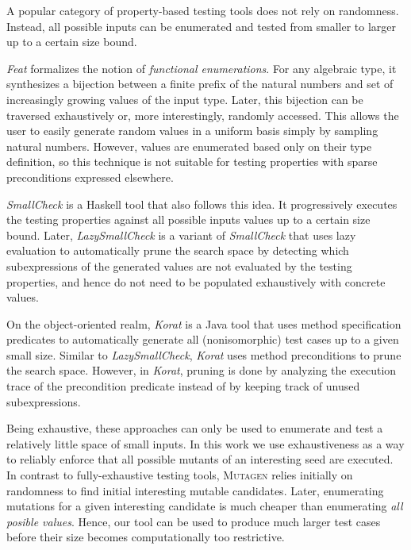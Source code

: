 \documentclass[acmsmall, anonymous]{acmart}
\newcommand{\mutagen}{\textsc{Mutagen}\xspace}
\begin{document}
A popular category of property-based testing tools does not rely on randomness.
%
Instead, all possible inputs can be enumerated and tested from smaller to larger
up to a certain size bound.

%
%
\emph{Feat} \cite{feat} formalizes the notion of \emph{functional enumerations}.
%
For any algebraic type, it synthesizes a bijection between a finite prefix of
the natural numbers and set of increasingly growing values of the input type.
%
Later, this bijection can be traversed exhaustively or, more interestingly,
randomly accessed.
%
This allows the user to easily generate random values in a uniform basis simply
by sampling natural numbers.
%
However, values are enumerated based only on their type definition, so this
technique is not suitable for testing properties with sparse preconditions
expressed elsewhere.


\emph{SmallCheck} \cite{smallcheck} is a Haskell tool that also follows this
idea.
%
It progressively executes the testing properties against all possible inputs
values up to a certain size bound.
%
Later, \emph{LazySmallCheck} is a variant of \emph{SmallCheck} that uses lazy
evaluation to automatically prune the search space by detecting which
subexpressions of the generated values are not evaluated by the testing
properties, and hence do not need to be populated exhaustively with concrete
values.



On the object-oriented realm, \emph{Korat} \cite{korat} is a Java tool that uses
method specification predicates to automatically generate all (nonisomorphic)
test cases up to a given small size.
%
Similar to \emph{LazySmallCheck}, \emph{Korat} uses method preconditions to
prune the search space.
%
However, in \emph{Korat}, pruning is done by analyzing the execution trace of
the precondition predicate instead of by keeping track of unused subexpressions.


Being exhaustive, these approaches can only be used to enumerate and test a
relatively little space of small inputs.
%
In this work we use exhaustiveness as a way to reliably enforce that all
possible mutants of an interesting seed are executed.
%
In contrast to fully-exhaustive testing tools, \mutagen relies initially on
randomness to find initial interesting mutable candidates.
%
Later, enumerating mutations for a given interesting candidate is much cheaper
than enumerating \emph{all posible values}.
%
Hence, our tool can be used to produce much larger test cases before their size
becomes computationally too restrictive.
\end{document}
